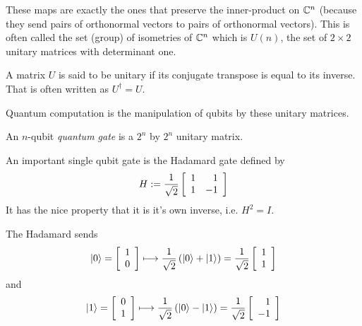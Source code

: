         These maps are exactly the ones that preserve the inner-product on $\mathbb{C}^n$ (because they send pairs of 
        orthonormal vectors to pairs of orthonormal vectors). This is often called the set (group) of isometries
        of $\mathbb{C}^n$ which is $U(n)$, the set of $2 \times 2$  unitary matrices with determinant one.
                
        \begin{definition}
            A matrix $U$ is said to be unitary if its conjugate transpose is equal to its inverse. That is often 
            written as $U^\dagger = U$.
        \end{definition}
        
        Quantum computation is the manipulation of qubits by these unitary matrices.

        \begin{definition}
            An $n$-qubit \emph{quantum gate} is a $2^n$ by $2^n$ unitary matrix.
        \end{definition}
        

        \begin{example}
            An important single qubit gate is the Hadamard gate defined by 
            \[
                H := \frac{1}{\sqrt{2}} \left[\begin{array}{rr}1&1\\1&-1\end{array}\right]
            \]
            It has the nice property that it is it's own inverse, i.e. $H^2 = I$.

            The Hadamard sends
            \[
                \ket{0} = \left[\begin{array}{r}1\\0\end{array}\right]  \longmapsto \frac{1}{\sqrt{2}}\left(\ket{0} + \ket{1}\right)  = 
                \frac{1}{\sqrt{2}} \left[\begin{array}{r}1\\1\end{array}\right]
            \]
            and
            \[
                \ket{1} = \left[\begin{array}{r}0\\1\end{array}\right] \longmapsto \frac{1}{\sqrt{2}}\left( \ket{0} - \ket{1} \right) = 
                \frac{1}{\sqrt{2}} \left[\begin{array}{r}1\\-1\end{array}\right]
            \]

        \end{example}
        



        





